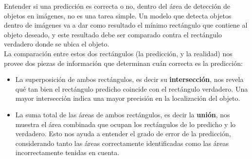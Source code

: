 \documentclass[a4paper]{article}
\begin{document}
\begin{figure}[H]
\end{figure}

Entender si una predicción es correcta o no, dentro del área de detección de objetos en imágenes, no es una tarea simple. Un modelo que detecta objetos dentro de imágenes va a dar como resultado el mínimo rectángulo que contiene al objeto deseado, y este resultado debe ser comparado contra el rectángulo verdadero donde se ubica el objeto.\\

La comparación entre estos dos rectángulos (la predicción, y la realidad) nos provee dos piezas de información que determinan cuán correcta es la predicción:

\begin{itemize}
\itemsep0em
    \item La superposición de ambos rectángulos, es decir su \textbf{intersección}, nos revela qué tan bien el rectángulo predicho coincide con el rectángulo verdadero. Una mayor intersección indica una mayor precisión en la localización del objeto.
    \item La suma total de las áreas de ambos rectángulos, es decir la \textbf{unión}, nos muestra el área combinada que ocupan los rectángulos de lo predicho y lo verdadero. Esto nos ayuda a entender el grado de error de la predicción, considerando tanto las áreas correctamente identificadas como las áreas incorrectamente tenidas en cuenta.
\end{itemize}
\end{document}
